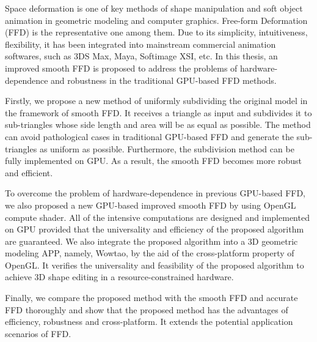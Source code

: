 

\begin{eabstract}
    Space deformation is one of key methods of shape manipulation and soft object animation in geometric modeling and computer graphics. Free-form Deformation (FFD) is the representative one among them. Due to its simplicity, intuitiveness, flexibility, it has been integrated into mainstream commercial animation softwares, such as 3DS Max, Maya, Softimage XSI, etc. In this thesis, an improved smooth FFD is proposed to address the problems of hardware-dependence and robustness in the traditional GPU-based FFD methods.

    Firstly, we propose a new method of uniformly subdividing the original model in the framework of smooth FFD. It receives a triangle as input and subdivides it to sub-triangles whose side length and area will be as equal as possible. The method can avoid pathological cases in traditional GPU-based FFD and generate the sub-triangles as uniform as possible. Furthermore, the subdivision method can be fully implemented on GPU. As a result, the smooth FFD becomes more robust and efficient.

    To overcome the problem of hardware-dependence in previous GPU-based FFD, we also proposed a new GPU-based improved smooth FFD by using OpenGL compute shader. All of the intensive computations are designed and implemented on GPU provided that the universality and efficiency of the proposed algorithm are guaranteed.  We also integrate the proposed algorithm into a 3D geometric modeling APP, namely, Wowtao, by the aid of the cross-platform property of OpenGL. It verifies the universality and feasibility of the proposed algorithm to achieve 3D shape editing in a resource-constrained hardware.

Finally, we compare the proposed method with the smooth FFD and accurate FFD thoroughly and show that the proposed method has the advantages of efficiency, robustness and cross-platform. It extends the potential application scenarios of FFD.
\end{eabstract}

